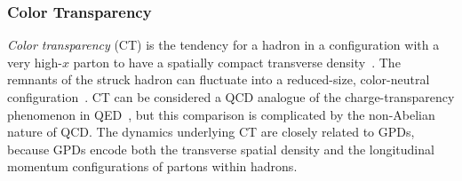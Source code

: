 \subsubsection{Color Transparency}
\label{sec:CT}
\textit{Color transparency} (CT) is the tendency for a hadron in a configuration with a very high-$x$ parton to have a spatially compact transverse density~\cite{Brodsky:CT}.
The remnants of the struck hadron can fluctuate into a reduced-size, color-neutral configuration~\cite{New:CT}.
CT can be considered a QCD analogue of the charge-transparency phenomenon in QED~\cite{QED:CT}, but this comparison is complicated by the non-Abelian nature of QCD.
The dynamics underlying CT are closely related to GPDs, because GPDs encode both the transverse spatial density and the longitudinal momentum configurations of partons within hadrons.


